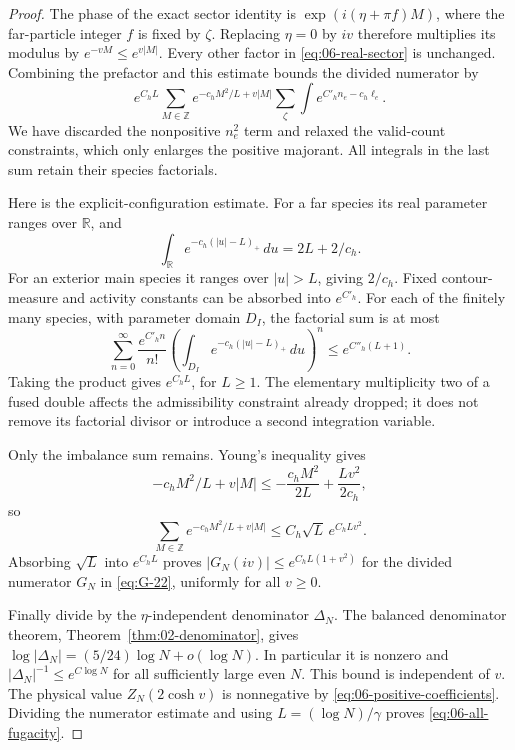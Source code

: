 \begin{proof}
The phase of the exact sector identity is
\(\exp(i(\eta+\pi f)M)\), where the far-particle integer \(f\) is
fixed by \(\zeta\). Replacing \(\eta=0\) by \(iv\) therefore
multiplies its modulus by \(e^{-vM}\le e^{v|M|}\). Every other factor
in \eqref{eq:06-real-sector} is unchanged. Combining the prefactor
and this estimate bounds the divided numerator by
\[
 e^{C_hL}
 \sum_{M\in\mathbb Z}e^{-c_hM^2/L+v|M|}
 \sum_{\zeta}\!\int
       e^{C'_hn_e-c_h\ell_e}.
\]
We have discarded the nonpositive \(n_e^2\) term and relaxed the
valid-count constraints, which only enlarges the positive majorant.
All integrals in the last sum retain their species factorials.

Here is the explicit-configuration estimate. For a far species its
real parameter ranges over \(\mathbb R\), and
\[
 \int_{\mathbb R}e^{-c_h(|u|-L)_+}\,du=2L+2/c_h.
\]
For an exterior main species it ranges over \(|u|>L\), giving
\(2/c_h\). Fixed contour-measure and activity constants can be
absorbed into \(e^{C'_h}\). For each of the finitely many species,
with parameter domain \(D_I\), the factorial sum is at most
\[
 \sum_{n=0}^{\infty}\frac{e^{C'_hn}}{n!}
 \left(\int_{D_I}e^{-c_h(|u|-L)_+}\,du\right)^n
 \le e^{C''_h(L+1)}.
\]
Taking the product gives \(e^{C_hL}\), for \(L\ge1\).
The elementary multiplicity two of a fused double affects the
admissibility constraint already dropped; it does not remove its
factorial divisor or introduce a second integration variable.

Only the imbalance sum remains. Young's inequality gives
\[
 -c_hM^2/L+v|M|
 \le-\frac{c_hM^2}{2L}+\frac{Lv^2}{2c_h},
\]
so
\[
 \sum_{M\in\mathbb Z}e^{-c_hM^2/L+v|M|}
 \le C_h\sqrt L\,e^{C_hLv^2}.
\]
Absorbing \(\sqrt L\) into \(e^{C_hL}\) proves
\( |G_N(iv)|\le e^{C_hL(1+v^2)}\) for the divided numerator
\(G_N\) in \eqref{eq:G-22}, uniformly for all \(v\ge0\).

Finally divide by the \(\eta\)-independent denominator \(\Delta_N\).
The balanced denominator theorem, Theorem~\ref{thm:02-denominator},
gives \(\log|\Delta_N|=(5/24)\log N+o(\log N)\). In particular
it is nonzero and \(|\Delta_N|^{-1}\le e^{C\log N}\) for all
sufficiently large even \(N\). This bound is independent of \(v\).
The physical value \(Z_N(2\cosh v)\) is nonnegative by
\eqref{eq:06-positive-coefficients}. Dividing the numerator estimate
and using \(L=(\log N)/\gamma\) proves
\eqref{eq:06-all-fugacity}.
\end{proof}

